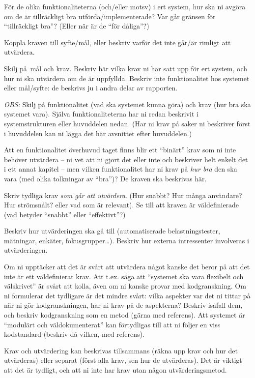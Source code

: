 För de olika funktionaliteterna (och/eller motsv) i ert system, hur ska ni avgöra om de är tillräckligt bra utförda/implementerade? Var går gränsen för ``tillräckligt bra''? (Eller när är de ``för dåliga''?)

Koppla kraven till syfte/mål, eller beskriv varför det inte går/är rimligt att utvärdera.

Skilj på mål och krav. Beskriv här vilka krav ni har satt upp för ert system, och hur ni ska utvärdera om de är uppfyllda. Beskriv inte funktionalitet hos systemet eller mål/syfte: de beskrivs ju i andra delar av rapporten.

\emph{OBS:} Skilj på funktionalitet (vad ska systemet kunna göra) och krav (hur bra ska systemet vara). Själva funktionaliteterna har ni redan beskrivit i systemstrukturen eller huvuddelen nedan. (Har ni krav på saker ni beskriver först i huvuddelen kan ni lägga det här avsnittet efter huvuddelen.)

Att en funktionalitet överhuvud taget finns blir ett ``binärt'' krav som ni inte behöver utvärdera -- ni vet att ni gjort det eller inte och beskriver helt enkelt det i ett annat kapitel  -- men vilken funktionalitet har ni krav på \emph{hur bra} den ska vara (med olika tolkningar av ``bra'')? De kraven ska beskrivas här.

Skriv tydliga krav \emph{som går att utvärdera}.  (Hur snabbt? Hur många användare? Hur strömsnålt? eller vad som är relevant). Se till att kraven är väldefinierade (vad betyder ``snabbt'' eller ``effektivt''?)

Beskriv hur utvärderingen ska gå till (automatiserade belastningstester, mätningar, en\-käter, fokusgrupper\ldots).
Beskriv hur externa intressenter involveras i utvärderingen.

Om ni upptäcker att det är svårt att utvärdera något kanske det beror på att det inte är ett väldefinierat krav. Att t.ex. säga att ``systemet ska vara flexibelt och välskrivet'' är svårt att kolla, även om ni kanske provar med kodgranskning.
 Om ni formulerar det tydligare är det mindre svårt: vilka aspekter var det ni tittar på när ni gör kodgranskningen, har ni krav på de aspekterna? Beskriv isåfall dem, och beskriv kodgranskning som en metod (gärna med referens). Att systemet är ``modulärt och väldokumenterat'' kan förtydligas till att ni följer en viss kodstandard (beskriv då vilken, med referens).

Krav och utvärdering kan beskrivas tillsammans (räkna upp krav och hur det utvärderas) eller separat (först alla krav, sen hur de utvärderas). Det är viktigt att det är tydligt, och att ni inte har krav utan någon utvärderingsmetod.

